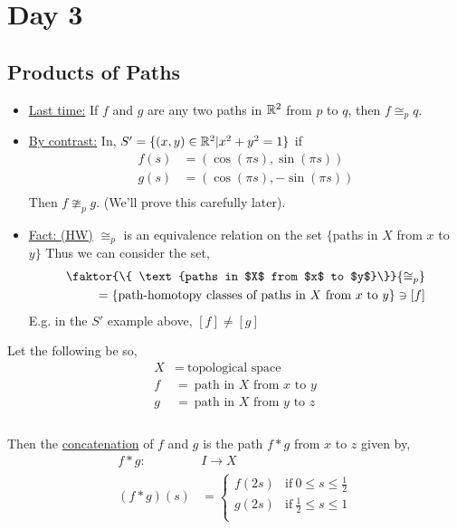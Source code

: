 \section{Day 3}
    \subsection{Products of Paths}
    \begin{itemize}
        \item \underline{Last time:} If $f$ and $g$ are any two paths in $\mathbb{R}^2$ from $p$ to $q$, then $f\cong_{p}q$.
        \item \underline{By contrast:} In, $S'=\{(x,y)\in \mathbb{R}^2| x^2+y^2=1\}$ if
            \begin{align*}
                f(s)&=(\cos(\pi s), \sin(\pi s))\\
                g(s)&=(\cos(\pi s), -\sin(\pi s))\\
            \end{align*}
            Then $f\ncong_{p}g$. (We'll prove this carefully later).
        \item \underline{Fact: (HW)} $\cong_{p}$ is an equivalence relation on the set $\{$paths in $X$ from $x$ to $y\}$
            Thus we can consider the set,
            \begin{align*}
                \faktor{\{ \text{paths in $X$ from $x$ to $y$}\}}{\cong_{p}}\\
                =\{\text{path-homotopy classes of paths in $X$ from $x$ to $y$}\}\ni [f]\\
            \end{align*}
            E.g. in the $S'$ example above, $[f]\neq[g]$
    \end{itemize}
        \begin{definition} Let the following be so,
            \begin{align*}
                X &=\ \text{topological space}\\
                f &=\ \text{path in $X$ from $x$ to $y$}\\
                g &=\ \text{path in $X$ from $y$ to $z$}\\
            \end{align*}\\
            Then the \underline{concatenation} of $f$ and $g$ is the path $f*g$ from $x$ to $z$ given by,
            \begin{align*}
                f*g: &I \rightarrow X\\
                (f*g)(s)&=\begin{cases}
                    f(2s) & \text{if}\ 0\leq s \leq \frac{1}{2}\\
                    g(2s) & \text{if}\ \frac{1}{2}\leq s \leq 1\\
                \end{cases}\\
            \end{align*}
        \end{definition}
